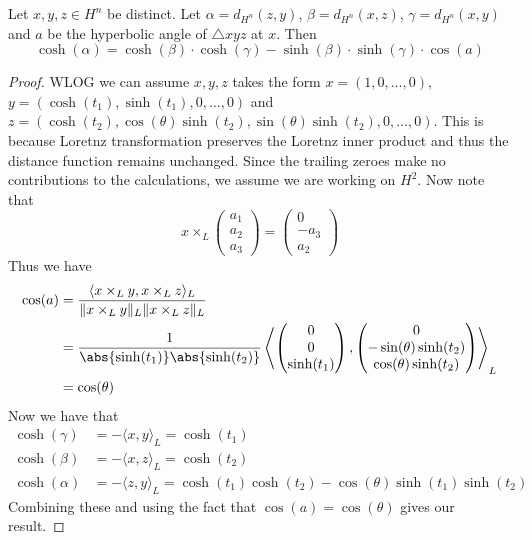 \begin{thm}{}{} Let $x,y,z\in H^n$ be distinct. Let $\alpha=d_{H^n}(z,y)$, $\beta=d_{H^n}(x,z)$, $\gamma=d_{H^n}(x,y)$ and $a$ be the hyperbolic angle of $\triangle xyz$ at $x$. Then $$\cosh(\alpha)=\cosh(\beta)\cdot\cosh(\gamma)-\sinh(\beta)\cdot\sinh(\gamma)\cdot\cos(a)$$ \tcbline
\begin{proof}
WLOG we can assume $x,y,z$ takes the form $x=(1,0,\dots,0)$, $y=(\cosh(t_1),\sinh(t_1),0,\dots,0)$ and $z=(\cosh(t_2),\cos(\theta)\sinh(t_2),\sin(\theta)\sinh(t_2),0,\dots,0)$. This is because Loretnz transformation preserves the Loretnz inner product and thus the distance function remains unchanged. Since the trailing zeroes make no contributions to the calculations, we assume we are working on $H^2$. Now note that $$x\times_L\begin{pmatrix}a_1\\a_2\\a_3\end{pmatrix}=\begin{pmatrix}0\\-a_3\\a_2\end{pmatrix}$$ Thus we have 
\begin{align*}
\cos(a)&=\frac{\langle x\times_Ly,x\times_Lz\rangle_L}{\|x\times_Ly\|_L\|x\times_Lz\|_L}\\
&=\frac{1}{\abs{\sinh(t_1)}\abs{\sinh(t_2)}}\left\langle\begin{pmatrix}0\\0\\\sinh(t_1)\end{pmatrix},\begin{pmatrix}0\\-\sin(\theta)\sinh(t_2)\\\cos(\theta)\sinh(t_2)\end{pmatrix}\right\rangle_L\\
&=\cos(\theta)
\end{align*}
Now we have that 
\begin{align*}
\cosh(\gamma)&=-\langle x,y\rangle_L=\cosh(t_1)\\
\cosh(\beta)&=-\langle x,z\rangle_L=\cosh(t_2)\\
\cosh(\alpha)&=-\langle z,y\rangle_L=\cosh(t_1)\cosh(t_2)-\cos(\theta)\sinh(t_1)\sinh(t_2)
\end{align*}
Combining these and using the fact that $\cos(a)=\cos(\theta)$ gives our result. 
\end{proof}
\end{thm}

